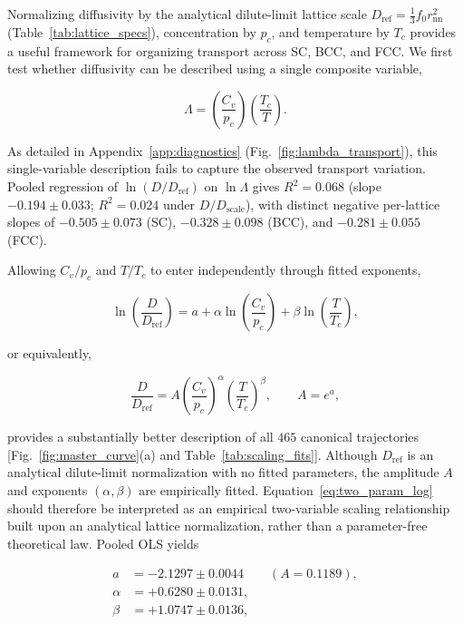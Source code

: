 \documentclass[aps,pre,reprint,superscriptaddress,amsmath,amssymb,floatfix]{revtex4-2}
\begin{document}
Normalizing diffusivity by the analytical dilute-limit lattice scale $D_{\mathrm{ref}} = \frac{1}{3}f_0 r_{\mathrm{nn}}^2$ (Table~\ref{tab:lattice_specs}), concentration by $p_c$, and temperature by $T_c$ provides a useful framework for organizing transport across SC, BCC, and FCC. We first test whether diffusivity can be described using a single composite variable,

\begin{equation}
\Lambda = \left(\frac{C_v}{p_c}\right)\left(\frac{T_c}{T}\right).
\label{eq:lambda}
\end{equation}

As detailed in Appendix~\ref{app:diagnostics} (Fig.~\ref{fig:lambda_transport}), this single-variable description fails to capture the observed transport variation. Pooled regression of $\ln(D/D_{\mathrm{ref}})$ on $\ln\Lambda$ gives $R^2 = 0.068$ (slope $-0.194 \pm 0.033$; $R^2 = 0.024$ under $D/D_{\mathrm{scale}}$), with distinct negative per-lattice slopes of $-0.505 \pm 0.073$ (SC), $-0.328 \pm 0.098$ (BCC), and $-0.281 \pm 0.055$ (FCC).

Allowing $C_v/p_c$ and $T/T_c$ to enter independently through fitted exponents,

\begin{equation}
\ln\!\left(\frac{D}{D_{\mathrm{ref}}}\right)
=
a + \alpha \ln\!\left(\frac{C_v}{p_c}\right)
+ \beta \ln\!\left(\frac{T}{T_c}\right),
\label{eq:two_param_log}
\end{equation}

or equivalently,

\begin{equation}
\frac{D}{D_{\mathrm{ref}}}
=
A\left(\frac{C_v}{p_c}\right)^\alpha
\left(\frac{T}{T_c}\right)^\beta,
\qquad A=e^a,
\end{equation}

provides a substantially better description of all $465$ canonical trajectories [Fig.~\ref{fig:master_curve}(a) and Table~\ref{tab:scaling_fits}]. Although $D_{\mathrm{ref}}$ is an analytical dilute-limit normalization with no fitted parameters, the amplitude $A$ and exponents $(\alpha,\beta)$ are empirically fitted. Equation~\eqref{eq:two_param_log} should therefore be interpreted as an empirical two-variable scaling relationship built upon an analytical lattice normalization, rather than a parameter-free theoretical law. Pooled OLS yields

\begin{align}
a &= -2.1297 \pm 0.0044 \qquad (A = 0.1189), \nonumber \\
\alpha &= +0.6280 \pm 0.0131, \nonumber \\
\beta &= +1.0747 \pm 0.0136,
\label{eq:free_fit_params}
\end{align}
\end{document}
